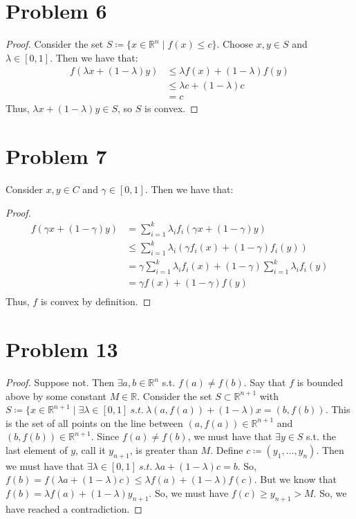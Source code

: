 \documentclass{article}
\begin{document}
\section*{Problem 6}

\begin{proof}
Consider the set $S \coloneqq \{x \in \mathbb{R}^n \mid f(x) \leq c\}$. Choose $x, y \in S$ and $\lambda \in [0, 1]$. Then we have that:
\begin{align*}
f(\lambda x + (1 - \lambda)y) &\leq \lambda f(x) + (1 - \lambda)f(y) \\
&\leq \lambda c + (1 - \lambda)c \\
&= c
\end{align*}
Thus, $\lambda x + (1 - \lambda)y \in S$, so $S$ is convex.
\end{proof}


\section*{Problem 7}
Consider $x, y \in C$ and $\gamma \in [0, 1]$. Then we have that:
\begin{proof}
\begin{align*}
f(\gamma x + (1 - \gamma)y) &= \sum\limits_{i = 1}^{k} \lambda_{i}f_{i}(\gamma x + (1 - \gamma) y) \\
&\leq \sum\limits_{i = 1}^{k} \lambda_{i}(\gamma f_{i}(x) + (1 - \gamma)f_{i}(y)) \\
&= \gamma\sum\limits_{i = 1}^{k} \lambda_{i}f_{i}(x) + (1 - \gamma)\sum\limits_{i = 1}^{k} \lambda_{i}f_{i}(y) \\
&= \gamma f(x) + (1 - \gamma)f(y) \\
\end{align*}
Thus, $f$ is convex by definition.
\end{proof}


\section*{Problem 13}

\begin{proof}
Suppose not. Then $\exists a, b \in \mathbb{R}^n$ s.t. $f(a) \ne f(b)$. Say that $f$ is bounded above by some constant $M \in \mathbb{R}$. Consider the set $S \subset \mathbb{R}^{n + 1}$ with $S \coloneqq \{x \in \mathbb{R}^{n + 1} \mid \exists \lambda \in [0, 1] \ s.t. \ \lambda (a, f(a)) + (1 - \lambda)x = (b, f(b))$. This is the set of all points on the line between $(a, f(a)) \in \mathbb{R}^{n + 1}$ and $(b, f(b)) \in \mathbb{R}^{n + 1}$. Since $f(a) \ne f(b)$, we must have that $\exists y \in S$ s.t. the last element of $y$, call it $y_{n + 1}$, is greater than $M$. Define $c \coloneqq (y_1, \dots, y_n)$. Then we must have that $\exists \lambda \in [0, 1] \ s.t. \ \lambda a + (1 - \lambda)c = b$. So, $f(b) = f(\lambda a + (1 - \lambda)c) \leq \lambda f(a) + (1 - \lambda)f(c)$. But we know that $f(b) = \lambda f(a) + (1 - \lambda)y_{n + 1}$. So, we must have $f(c) \geq y_{n + 1} > M$. So, we have reached a contradiction.
\end{proof}
\end{document}
